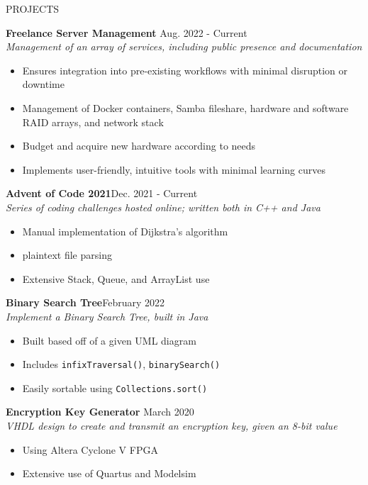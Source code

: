 \documentclass[UTF-8]{resume} \usepackage{multirow}
\begin{document}
\begin{rSection}{PROJECTS}
	\vspace{-1.5em}
    \item \textbf{Freelance Server Management} \hfill {Aug. 2022 - Current}\\
    \emph{Management of an array of services, including public presence and documentation}
	\begin{itemize}
		\itemsep -6pt {}
		\item Ensures integration into pre-existing workflows with minimal disruption or downtime
        \item Management of Docker containers, Samba fileshare, hardware and software RAID arrays, and network stack
		\item Budget and acquire new hardware according to needs
        \item Implements user-friendly, intuitive tools with minimal learning curves
	\end{itemize}
	\item \textbf{Advent of Code 2021}\hfill {Dec. 2021 - Current}\\
	\emph{Series of coding challenges hosted online; written both in C++ and Java}
	\begin{itemize}
		\itemsep -6pt {}
		\item Manual implementation of Dijkstra's algorithm
		\item plaintext file parsing
		\item Extensive Stack, Queue, and ArrayList use
	\end{itemize}
	\item \textbf{Binary Search Tree}\hfill {February 2022} \\
	\emph{ Implement a Binary Search Tree, built in Java}
	\begin{itemize}
		\itemsep -6pt {}
		\item Built based off of a given UML diagram
		\item Includes \verb|infixTraversal()|, \verb|binarySearch()|
		\item Easily sortable using \verb|Collections.sort()|
	\end{itemize}
	\item \textbf{Encryption Key Generator} \hfill{March 2020}\\
	\emph{VHDL design to create and transmit an encryption key, given an 8-bit value}
	\begin{itemize}

		\itemsep -6pt {}
		\item Using Altera Cyclone V FPGA
		\item Extensive use of Quartus and Modelsim
	\end{itemize}
\end{rSection}
\end{document}
